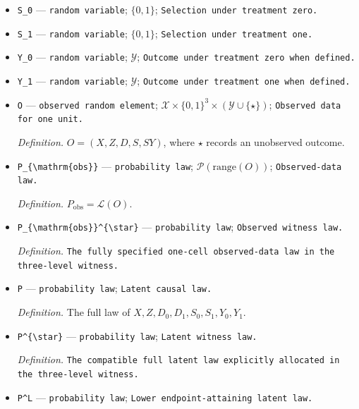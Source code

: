 \documentclass{article}
\begin{document}
\begin{itemize}
  \item \texttt{S\_\allowbreak{}0} --- \texttt{random variable}; \(\{0,1\}\); \texttt{Selection under treatment zero.}
  \item \texttt{S\_\allowbreak{}1} --- \texttt{random variable}; \(\{0,1\}\); \texttt{Selection under treatment one.}
  \item \texttt{Y\_\allowbreak{}0} --- \texttt{random variable}; \(\mathcal Y\); \texttt{Outcome under treatment zero when defined.}
  \item \texttt{Y\_\allowbreak{}1} --- \texttt{random variable}; \(\mathcal Y\); \texttt{Outcome under treatment one when defined.}
  \item \texttt{O} --- \texttt{observed random element}; \(\mathcal X\times\{0,1\}^3\times(\mathcal Y\cup\{\star\})\); \texttt{Observed data for one unit.}
  \par\smallskip\noindent\emph{Definition.} \(O=(X,Z,D,S,SY)\), where \(\star\) records an unobserved outcome.
  \item \texttt{P\_\allowbreak{}\{\textbackslash{}\allowbreak{}mathrm\{obs\}\allowbreak{}\}\allowbreak{}} --- \texttt{probability law}; \(\mathcal P(\mathrm{range}(O))\); \texttt{Observed-\allowbreak{}data law.}
  \par\smallskip\noindent\emph{Definition.} \(P_{\mathrm{obs}}=\mathcal L(O)\).
  \item \texttt{P\_\allowbreak{}\{\textbackslash{}\allowbreak{}mathrm\{obs\}\allowbreak{}\}\allowbreak{}\textasciicircum{}\{\textbackslash{}\allowbreak{}star\}\allowbreak{}} --- \texttt{probability law}; \texttt{Observed witness law.}
  \par\smallskip\noindent\emph{Definition.} \texttt{The fully specified one-\allowbreak{}cell observed-\allowbreak{}data law in the three-\allowbreak{}level witness.}
  \item \texttt{P} --- \texttt{probability law}; \texttt{Latent causal law.}
  \par\smallskip\noindent\emph{Definition.} The full law of \(X,Z,D_0,D_1,S_0,S_1,Y_0,Y_1\).
  \item \texttt{P\textasciicircum{}\{\textbackslash{}\allowbreak{}star\}\allowbreak{}} --- \texttt{probability law}; \texttt{Latent witness law.}
  \par\smallskip\noindent\emph{Definition.} \texttt{The compatible full latent law explicitly allocated in the three-\allowbreak{}level witness.}
  \item \texttt{P\textasciicircum{}L} --- \texttt{probability law}; \texttt{Lower endpoint-\allowbreak{}attaining latent law.}

\end{itemize}
\end{document}
